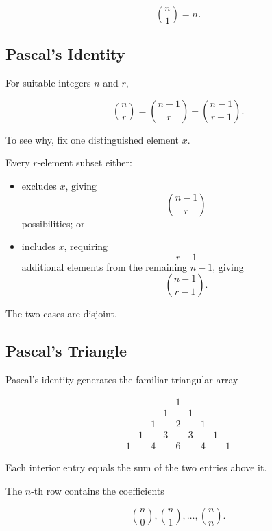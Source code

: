 \[
\boxed{
\binom{n}{1}=n.
}
\]

\subsection{Pascal's Identity}
\label{subsec:pascals-identity}

\begin{theorem}
For suitable integers \(n\) and \(r\),

\[
\boxed{
\binom{n}{r}
=
\binom{n-1}{r}
+
\binom{n-1}{r-1}.
}
\]
\end{theorem}

To see why, fix one distinguished element \(x\).

Every \(r\)-element subset either:

\begin{itemize}
    \item excludes \(x\), giving
    \[
    \binom{n-1}{r}
    \]
    possibilities; or

    \item includes \(x\), requiring
    \[
    r-1
    \]
    additional elements from the remaining \(n-1\), giving
    \[
    \binom{n-1}{r-1}.
    \]
\end{itemize}

The two cases are disjoint.

\subsection{Pascal's Triangle}
\label{subsec:pascals-triangle}

Pascal's identity generates the familiar triangular array

\[
\begin{array}{ccccccccc}
&&&&1&&&&\\
&&&1&&1&&&\\
&&1&&2&&1&&\\
&1&&3&&3&&1&\\
1&&4&&6&&4&&1
\end{array}
\]

Each interior entry equals the sum of the two entries above it.

The \(n\)-th row contains the coefficients

\[
\boxed{
\binom{n}{0},
\binom{n}{1},
\ldots,
\binom{n}{n}.
}
\]

